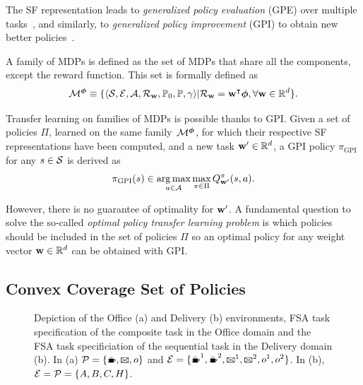 The SF representation leads to \textit{generalized policy evaluation} (GPE) over multiple tasks~\citep{Barreto2020a}, and similarly, to \textit{generalized policy improvement} (GPI) to obtain new better policies~\citep{Barreto2017}.

A family of MDPs is defined as the set of MDPs that share all the components, except the reward function. This set is formally defined as 
\begin{equation*}
    \mathcal{M}^{\boldsymbol{\phi}}\equiv\{\langle\mathcal{S},\mathcal{E},\mathcal{A},\mathcal{R}_{\mathbf{w}},\mathbb{P}_0, \mathbb{P},\gamma\rangle \lvert \mathcal{R}_{\mathbf{w}} = \mathbf{w}^\intercal \boldsymbol{\phi}, \forall\mathbf{w}\in\mathbb{R}^d\}.
\end{equation*}

Transfer learning on families of MDPs is possible thanks to GPI. Given a set of policies $\Pi$, learned on the same family~$\mathcal{M}^{\boldsymbol{\phi}}$, for which their respective SF representations have been computed, and a new task $\mathbf{w}'\in\mathbb{R}^d$, a GPI policy $\pi_{\text{GPI}}$ for any $s\in\mathcal{S}$ is derived as 
\begin{equation}
    \pi_{\text{GPI}}(s) \in \operatorname*{arg\,max}_{a\in\mathcal{A}} \max_{\pi\in\Pi} Q^\pi_{\mathbf{w}'}(s, a).
    \label{eq:gpi}
\end{equation}

However, there is no guarantee of optimality for $\mathbf{w}'$.
A fundamental question to solve the so-called \textit{optimal policy transfer learning problem} is which policies should be included in the set of policies $\Pi$ so an optimal policy for any weight vector $\mathbf{w}\in\mathbb{R}^d$ can be obtained with GPI. 

\subsection*{Convex Coverage Set of Policies}

\begin{figure}[!tb]
  \begin{subfigure}[t]{0.5\textwidth}
    \centering
    
    \subcaption{}
    \label{fig:office_domain}
  \end{subfigure} 
  \hfill
  \begin{subfigure}[t]{0.5\textwidth}
    \centering
    
    \subcaption{}
    \label{fig:delivery_domain}
  \end{subfigure}
  \hfill
  \caption{Depiction of the Office (a) and Delivery (b) environments, FSA task specification of the composite task in the Office domain and the FSA task specificiation of the sequential task in the Delivery domain (b). In (a) $\cP=\{\text{\coffee}, \text{\mail}, o\}$ and $\cE=\{\text{\coffee}^1,\text{\coffee}^2, \text{\mail}^1,\text{\mail}^2, o^1, o^2\}$. In (b), $\mathcal{E}=\mathcal{P}=\{A, B, C, H\}$.}
 \label{fig:domains}
\end{figure}

